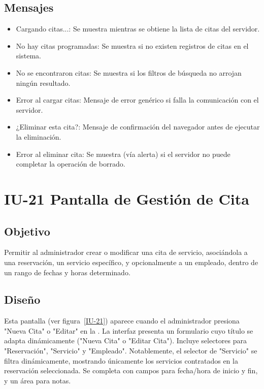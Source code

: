 \subsection{Mensajes}
\begin{itemize}
    \item Cargando citas...: Se muestra mientras se obtiene la lista de citas del servidor.
    \item No hay citas programadas: Se muestra si no existen registros de citas en el sistema.
    \item No se encontraron citas: Se muestra si los filtros de búsqueda no arrojan ningún resultado.
    \item Error al cargar citas: Mensaje de error genérico si falla la comunicación con el servidor.
    \item ¿Eliminar esta cita?: Mensaje de confirmación del navegador antes de ejecutar la eliminación.
    \item Error al eliminar cita: Se muestra (vía alerta) si el servidor no puede completar la operación de borrado.
\end{itemize}
\section{IU-21 Pantalla de Gestión de Cita}

\subsection{Objetivo}
    Permitir al administrador crear o modificar una cita de servicio, asociándola a una reservación, un servicio específico, y opcionalmente a un empleado, dentro de un rango de fechas y horas determinado.

\subsection{Diseño}
    Esta pantalla  (ver figura~\ref{IU-21}) aparece cuando el administrador presiona "Nueva Cita" o "Editar" en la . La interfaz presenta un formulario cuyo título se adapta dinámicamente ("Nueva Cita" o "Editar Cita"). Incluye selectores para "Reservación", "Servicio" y "Empleado". Notablemente, el selector de "Servicio" se filtra dinámicamente, mostrando únicamente los servicios contratados en la reservación seleccionada. Se completa con campos para fecha/hora de inicio y fin, y un área para notas.

